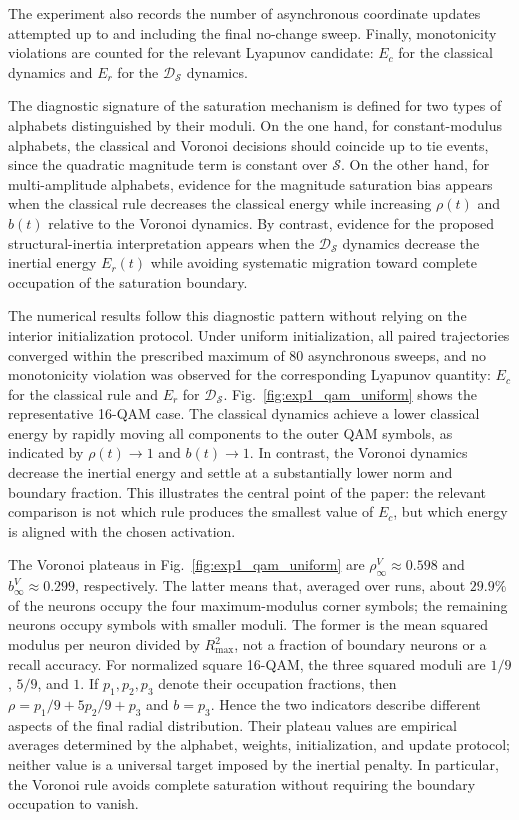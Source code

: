 \documentclass[10pt,journal,letterpaper]{IEEEtran}
\begin{document}
The experiment also records the number of asynchronous coordinate updates
attempted up to and including the final no-change sweep. Finally, monotonicity violations are counted
for the relevant Lyapunov candidate: $E_c$ for the classical dynamics and
$E_r$ for the $\mathcal{D}_{\mathcal{S}}$ dynamics.

The diagnostic signature of the saturation mechanism is defined for two
types of alphabets distinguished by their moduli. On the one hand, for
constant-modulus alphabets, the classical and Voronoi decisions should coincide
up to tie events, since the quadratic magnitude term is constant over
$\mathcal{S}$. On the other hand, for multi-amplitude alphabets, evidence for the magnitude
saturation bias appears when the classical rule decreases the classical energy
while increasing $\rho(t)$ and $b(t)$ relative to the Voronoi dynamics. By
contrast, evidence for the proposed structural-inertia interpretation appears
when the $\mathcal{D}_{\mathcal{S}}$ dynamics decrease the inertial energy
$E_r(t)$ while avoiding systematic migration toward complete occupation of the
saturation boundary.

The numerical results follow this diagnostic pattern without relying on the
interior initialization protocol. Under uniform initialization, all paired
trajectories converged within the prescribed maximum of $80$ asynchronous
sweeps, and no monotonicity violation was observed for the corresponding
Lyapunov quantity: $E_c$ for the classical rule and $E_r$ for
$\mathcal{D}_{\mathcal{S}}$. Fig.~\ref{fig:exp1_qam_uniform} shows the
representative 16-QAM case. The classical dynamics achieve a lower classical
energy by rapidly moving all components to the outer QAM symbols, as indicated
by $\rho(t)\to 1$ and $b(t)\to 1$. In contrast, the Voronoi dynamics decrease
the inertial energy and settle at a substantially lower norm and boundary
fraction. This illustrates the central point of the paper: the relevant
comparison is not which rule produces the smallest value of $E_c$, but which
energy is aligned with the chosen activation.

The Voronoi plateaus in Fig.~\ref{fig:exp1_qam_uniform} are
$\rho_\infty^V\approx0.598$ and $b_\infty^V\approx0.299$, respectively.
The latter means that, averaged over runs, about $29.9\%$ of the neurons
occupy the four maximum-modulus corner symbols; the remaining neurons occupy
symbols with smaller moduli. The former is the mean squared modulus per
neuron divided by $R_{\max}^2$, not a fraction of boundary neurons or a
recall accuracy. For normalized square 16-QAM, the three squared moduli are
$1/9$, $5/9$, and $1$. If $p_1,p_2,p_3$ denote their occupation fractions,
then $\rho=p_1/9+5p_2/9+p_3$ and $b=p_3$. Hence the two indicators describe
different aspects of the final radial distribution. Their plateau values are
empirical averages determined by the alphabet, weights, initialization, and
update protocol; neither value is a universal target imposed by the inertial
penalty. In particular, the Voronoi rule avoids complete saturation without
requiring the boundary occupation to vanish.
\end{document}
